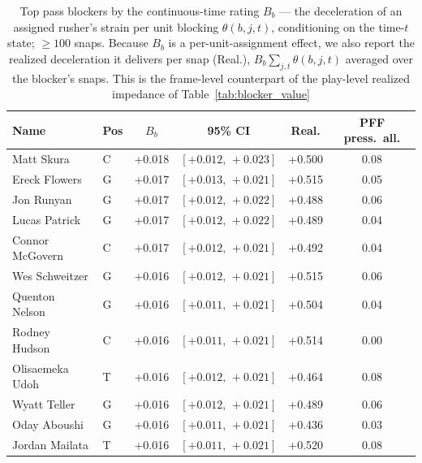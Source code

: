 \begin{table}[h!]
\centering
\footnotesize
\begin{tabular}{llcccc}
\toprule
Name & Pos & $B_b$ & 95\% CI & Real. & PFF press.\ all. \\
\midrule
Matt Skura & C & +0.018 & $[+0.012,\,+0.023]$ & +0.500 & 0.08 \\
Ereck Flowers & G & +0.017 & $[+0.013,\,+0.021]$ & +0.515 & 0.05 \\
Jon Runyan & G & +0.017 & $[+0.012,\,+0.022]$ & +0.488 & 0.06 \\
Lucas Patrick & G & +0.017 & $[+0.012,\,+0.022]$ & +0.489 & 0.04 \\
Connor McGovern & C & +0.017 & $[+0.012,\,+0.021]$ & +0.492 & 0.04 \\
Wes Schweitzer & G & +0.016 & $[+0.012,\,+0.021]$ & +0.515 & 0.06 \\
Quenton Nelson & G & +0.016 & $[+0.011,\,+0.021]$ & +0.504 & 0.04 \\
Rodney Hudson & C & +0.016 & $[+0.011,\,+0.021]$ & +0.514 & 0.00 \\
Olisaemeka Udoh & T & +0.016 & $[+0.012,\,+0.021]$ & +0.464 & 0.08 \\
Wyatt Teller & G & +0.016 & $[+0.012,\,+0.021]$ & +0.489 & 0.06 \\
Oday Aboushi & G & +0.016 & $[+0.011,\,+0.021]$ & +0.436 & 0.03 \\
Jordan Mailata & T & +0.016 & $[+0.011,\,+0.021]$ & +0.520 & 0.08 \\
\bottomrule
\end{tabular}
\caption{Top pass blockers by the continuous-time rating $B_b$ --- the deceleration of an assigned rusher's strain per unit blocking $\theta(b,j,t)$, conditioning on the time-$t$ state; $\geq 100$ snaps. Because $B_b$ is a per-unit-assignment effect, we also report the realized deceleration it delivers per snap (Real.), $B_b\sum_{j,t}\theta(b,j,t)$ averaged over the blocker's snaps. This is the frame-level counterpart of the play-level realized impedance of Table~\ref{tab:blocker_value}}
\label{tab:blocker_delta_leaders}
\end{table}
